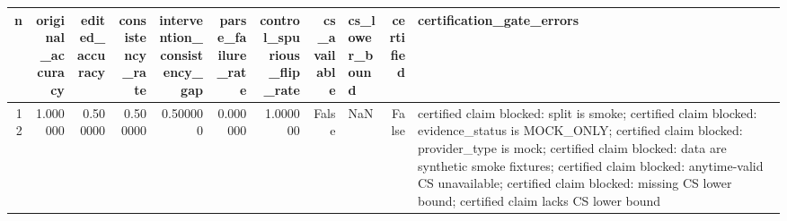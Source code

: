 \begin{tabular}{rrrrrrrrlrl}
\toprule
n & original_accuracy & edited_accuracy & consistency_rate & intervention_consistency_gap & parse_failure_rate & control_spurious_flip_rate & cs_available & cs_lower_bound & certified & certification_gate_errors \\
\midrule
12 & 1.000000 & 0.500000 & 0.500000 & 0.500000 & 0.000000 & 1.000000 & False & NaN & False & certified claim blocked: split is smoke; certified claim blocked: evidence_status is MOCK_ONLY; certified claim blocked: provider_type is mock; certified claim blocked: data are synthetic smoke fixtures; certified claim blocked: anytime-valid CS unavailable; certified claim blocked: missing CS lower bound; certified claim lacks CS lower bound \\
\bottomrule
\end{tabular}
